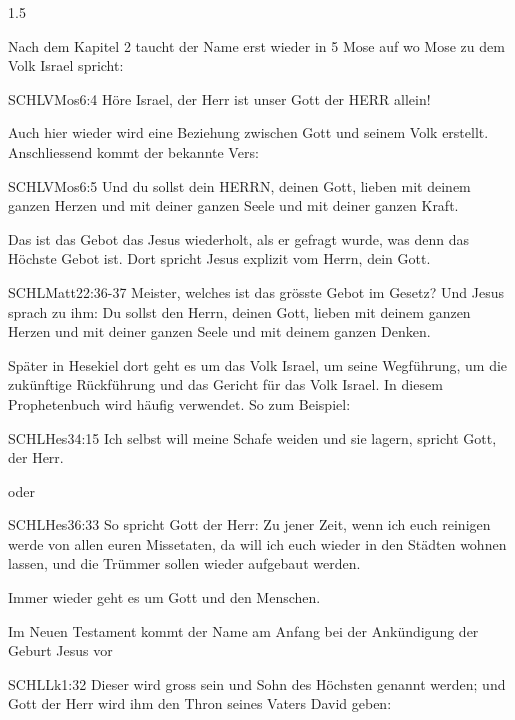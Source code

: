 \documentclass[fontsize=14pt]{../../inc/mybib}
\begin{document}
\begin{spacing}{1.5}
\begin{block}
        Nach dem Kapitel 2 taucht der Name erst wieder in 5 Mose auf wo Mose zu dem Volk Israel spricht:
        \begin{bibelbox}{SCHL}{VMos}{6:4}
            Höre Israel, der Herr ist unser Gott der HERR allein!
        \end{bibelbox}
        Auch hier wieder wird eine Beziehung zwischen Gott und seinem Volk erstellt.
        Anschliessend kommt der bekannte Vers:
        \begin{bibelbox}{SCHL}{VMos}{6:5}
            Und du sollst dein HERRN, deinen Gott, lieben mit deinem ganzen Herzen und mit deiner ganzen Seele und mit deiner ganzen Kraft.
        \end{bibelbox}
        Das ist das Gebot das Jesus wiederholt, als er gefragt wurde, was denn das Höchste Gebot ist. Dort spricht Jesus explizit vom Herrn, dein Gott.
        \begin{bibelbox}{SCHL}{Matt}{22:36-37}
            Meister, welches ist das grösste Gebot im Gesetz? Und Jesus sprach zu ihm: Du sollst den Herrn, deinen Gott, lieben mit deinem ganzen Herzen und mit deiner ganzen Seele und mit deinem ganzen Denken.
        \end{bibelbox}

        Später in Hesekiel dort geht es um das Volk Israel, um seine Wegführung, um die zukünftige Rückführung und das Gericht für das Volk Israel. In diesem Prophetenbuch wird häufig  verwendet. So zum Beispiel:
        \begin{bibelbox}{SCHL}{Hes}{34:15}
            Ich selbst will meine Schafe weiden und sie lagern, spricht Gott, der Herr.
        \end{bibelbox}
        oder
        \begin{bibelbox}{SCHL}{Hes}{36:33}
            So spricht Gott der Herr: Zu jener Zeit, wenn ich euch reinigen werde von allen euren Missetaten, da will ich euch wieder in den Städten wohnen lassen, und die Trümmer sollen wieder aufgebaut werden.
        \end{bibelbox}
        Immer wieder geht es um Gott und den Menschen.

        Im Neuen Testament kommt der Name am Anfang bei der Ankündigung der Geburt Jesus vor
        \begin{bibelbox}{SCHL}{Lk}{1:32}
            Dieser wird gross sein und Sohn des Höchsten genannt werden; und Gott der Herr wird ihm den Thron seines Vaters David geben:
        \end{bibelbox}


\end{block}
\end{spacing}
\end{document}
